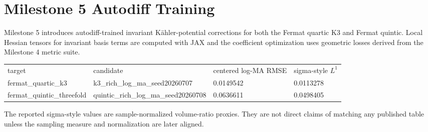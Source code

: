 \documentclass{article}
\begin{document}
\section{Milestone 5 Autodiff Training}
Milestone 5 introduces autodiff-trained invariant Kähler-potential corrections for both the Fermat quartic K3 and Fermat quintic. Local Hessian tensors for invariant basis terms are computed with JAX and the coefficient optimization uses geometric losses derived from the Milestone 4 metric suite.

\begin{center}
\begin{tabular}{llll}
target & candidate & centered log-MA RMSE & sigma-style $L^1$ \\
fermat_quartic_k3 & k3_rich_log_ma_seed20260707 & 0.0149542 & 0.0113278 \\
fermat_quintic_threefold & quintic_rich_log_ma_seed20260708 & 0.0636611 & 0.0498405 \\
\end{tabular}
\end{center}

The reported sigma-style values are sample-normalized volume-ratio proxies. They are not direct claims of matching any published table unless the sampling measure and normalization are later aligned.
\end{document}
